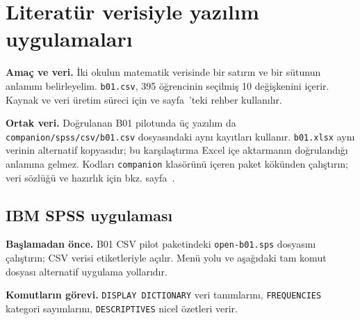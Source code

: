 \section{Literatür verisiyle yazılım uygulamaları}
\label{sec:spss-b01}

\textbf{Amaç ve veri.} İki okulun matematik verisinde bir satırın ve bir
sütunun anlamını belirleyelim. \texttt{b01.csv}, 395 öğrencinin seçilmiş
10 değişkenini içerir. Kaynak ve veri üretim süreci için
\citet{cortez2008data} ve sayfa~\pageref{sec:spss-guide}'teki rehber kullanılır.


\textbf{Ortak veri.} Doğrulanan B01 pilotunda üç yazılım da
\nolinkurl{companion/spss/csv/b01.csv} dosyasındaki aynı kayıtları kullanır.
\texttt{b01.xlsx} aynı verinin alternatif kopyasıdır; bu karşılaştırma
Excel içe aktarmanın doğrulandığı anlamına gelmez. Kodları
\texttt{companion} klasörünü içeren paket kökünden çalıştırın; veri sözlüğü
ve hazırlık için bkz. sayfa~\pageref{sec:spss-guide}.

\subsection{IBM SPSS uygulaması}
\textbf{Başlamadan önce.} B01 CSV pilot paketindeki
\texttt{open-b01.sps} dosyasını çalıştırın; CSV verisi etiketleriyle açılır.
Menü yolu ve aşağıdaki tam komut dosyası alternatif uygulama yollarıdır.

\begin{spssadimlar}
\end{spssadimlar}

{\raggedright
\noindent\textbf{Komutların görevi.} \texttt{DISPLAY DICTIONARY} veri tanımlarını, \texttt{FREQUENCIES} kategori sayımlarını, \texttt{DESCRIPTIVES} nicel özetleri verir.\par}

